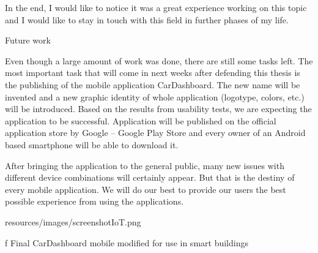 In the end, I would like to notice it was a great experience working on this topic and I would like to stay in touch with this field in further phases of my life.

\sec Future work

Even though a large amount of work was done, there are still some tasks left. The most important task that will come in next weeks after defending this thesis is the publishing of the mobile application CarDashboard. The new name will be invented and a new graphic identity of whole application (logotype, colors, etc.) will be introduced. Based on the results from usability tests, we are expecting the application to be successful. Application will be published on the official application store by Google -- Google Play Store and every owner of an Android based smartphone will be able to download it.

After bringing the application to the general public, many new issues with different device combinations will certainly appear. But that is the destiny of every mobile application. We will do our best to provide our users the best possible experience from using the applications.

\midinsert {}
\picw=10cm \cinspic resources/images/screenshotIoT.png 
\caption/f Final CarDashboard mobile modified for use in smart buildings
\endinsert





